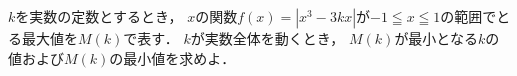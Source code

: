 \documentclass[../../main.tex]{subfiles}
\begin{document}
$k$を実数の定数とするとき，
$x$の関数$f(x)=|x^3-3kx|$が$-1 \leqq x \leqq 1$の範囲でとる最大値を$M(k)$で表す．
$k$が実数全体を動くとき，
$M(k)$が最小となる$k$の値および$M(k)$の最小値を求めよ．
\end{document}
